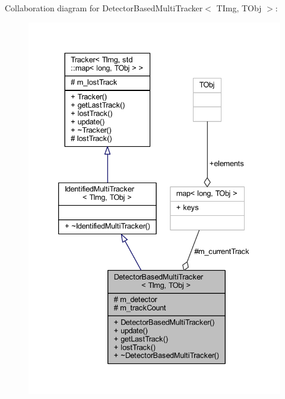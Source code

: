 Collaboration diagram for Detector\+Based\+Multi\+Tracker$<$ T\+Img, T\+Obj $>$\+:
\nopagebreak
\begin{figure}[H]
\begin{center}
\leavevmode
\includegraphics[width=333pt]{class_vision_core_1_1_abstractions_1_1_detector_based_multi_tracker__coll__graph}
\end{center}
\end{figure}
